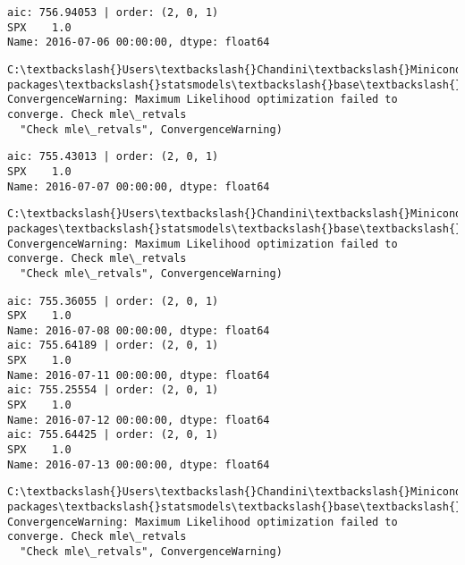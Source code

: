 \documentclass[11pt]{article}
\begin{document}
    \begin{Verbatim}[commandchars=\\\{\}]
aic: 756.94053 | order: (2, 0, 1)
SPX    1.0
Name: 2016-07-06 00:00:00, dtype: float64

    \end{Verbatim}

    \begin{Verbatim}[commandchars=\\\{\}]
C:\textbackslash{}Users\textbackslash{}Chandini\textbackslash{}Miniconda3\textbackslash{}envs\textbackslash{}auquan\textbackslash{}lib\textbackslash{}site-packages\textbackslash{}statsmodels\textbackslash{}base\textbackslash{}model.py:496: ConvergenceWarning: Maximum Likelihood optimization failed to converge. Check mle\_retvals
  "Check mle\_retvals", ConvergenceWarning)

    \end{Verbatim}

    \begin{Verbatim}[commandchars=\\\{\}]
aic: 755.43013 | order: (2, 0, 1)
SPX    1.0
Name: 2016-07-07 00:00:00, dtype: float64

    \end{Verbatim}

    \begin{Verbatim}[commandchars=\\\{\}]
C:\textbackslash{}Users\textbackslash{}Chandini\textbackslash{}Miniconda3\textbackslash{}envs\textbackslash{}auquan\textbackslash{}lib\textbackslash{}site-packages\textbackslash{}statsmodels\textbackslash{}base\textbackslash{}model.py:496: ConvergenceWarning: Maximum Likelihood optimization failed to converge. Check mle\_retvals
  "Check mle\_retvals", ConvergenceWarning)

    \end{Verbatim}

    \begin{Verbatim}[commandchars=\\\{\}]
aic: 755.36055 | order: (2, 0, 1)
SPX    1.0
Name: 2016-07-08 00:00:00, dtype: float64
aic: 755.64189 | order: (2, 0, 1)
SPX    1.0
Name: 2016-07-11 00:00:00, dtype: float64
aic: 755.25554 | order: (2, 0, 1)
SPX    1.0
Name: 2016-07-12 00:00:00, dtype: float64
aic: 755.64425 | order: (2, 0, 1)
SPX    1.0
Name: 2016-07-13 00:00:00, dtype: float64

    \end{Verbatim}

    \begin{Verbatim}[commandchars=\\\{\}]
C:\textbackslash{}Users\textbackslash{}Chandini\textbackslash{}Miniconda3\textbackslash{}envs\textbackslash{}auquan\textbackslash{}lib\textbackslash{}site-packages\textbackslash{}statsmodels\textbackslash{}base\textbackslash{}model.py:496: ConvergenceWarning: Maximum Likelihood optimization failed to converge. Check mle\_retvals
  "Check mle\_retvals", ConvergenceWarning)

    \end{Verbatim}
\end{document}
